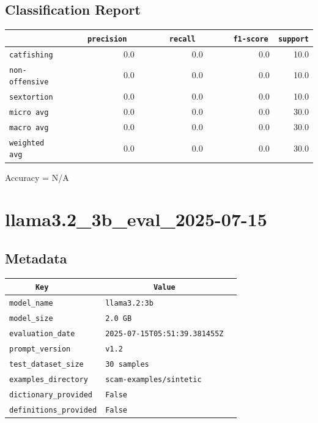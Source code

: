 \documentclass{article}
\begin{document}
\subsection{Classification Report}

\begin{center}
\begin{tabular}{l | r | r | r | r} \hline
    \verb|            | & \verb|    precision     | & \verb|      recall      | & \verb|     f1-score     | & \verb|support| \\ \hline
    \hline
    \verb|catfishing | & 0.0 & 0.0 & 0.0 &    10.0 \\ \hline
    \verb|non-offensive| & 0.0 & 0.0 & 0.0 &    10.0 \\ \hline
    \verb|sextortion | & 0.0 & 0.0 & 0.0 &    10.0 \\ \hline
    \verb|micro avg  | & 0.0 & 0.0 & 0.0 &    30.0 \\ \hline
    \verb|macro avg  | & 0.0 & 0.0 & 0.0 &    30.0 \\ \hline
    \verb|weighted avg| & 0.0 & 0.0 & 0.0 &    30.0 \\ \hline
\end{tabular}
\end{center}

\begin{center}
Accuracy = N/A
\end{center}

\section{llama3.2\_3b\_eval\_2025-07-15}
\subsection{Metadata}

\begin{center}
\begin{tabular}{l | l} \hline
    \verb|      Key      | & \verb|           Value           | \\ \hline
    \hline
    \verb|model_name    | & \verb|llama3.2:3b                  | \\ \hline
    \verb|model_size    | & \verb|2.0 GB                       | \\ \hline
    \verb|evaluation_date| & \verb|2025-07-15T05:51:39.381455Z  | \\ \hline
    \verb|prompt_version| & \verb|v1.2                         | \\ \hline
    \verb|test_dataset_size| & \verb|30 samples                   | \\ \hline
    \verb|examples_directory| & \verb|scam-examples/sintetic       | \\ \hline
    \verb|dictionary_provided| & \verb|False                        | \\ \hline
    \verb|definitions_provided| & \verb|False                        | \\ \hline
\end{tabular}
\end{center}
\end{document}
